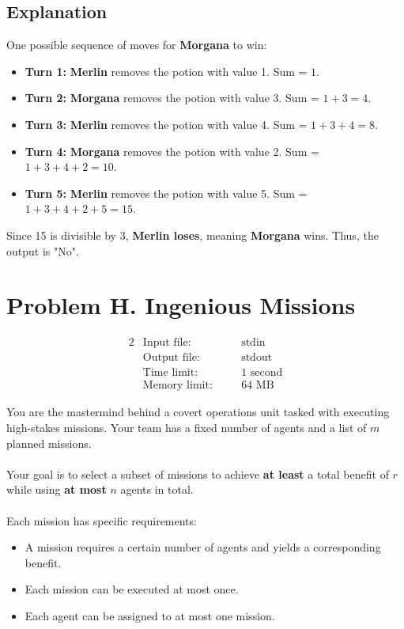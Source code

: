 \documentclass[12pt,a4paper]{article}
\begin{document}
\subsection*{\fontsize{16}{12}Explanation}
One possible sequence of moves for \textbf{Morgana} to win:
\begin{itemize}
    \item \textbf{Turn 1:} \textbf{Merlin} removes the potion with value 1. Sum = \( 1 \).
    \item \textbf{Turn 2:} \textbf{Morgana} removes the potion with value 3. Sum = \( 1 + 3 = 4 \).
    \item \textbf{Turn 3:} \textbf{Merlin} removes the potion with value 4. Sum = \( 1 + 3 + 4 = 8 \).
    \item \textbf{Turn 4:} \textbf{Morgana} removes the potion with value 2. Sum = \( 1 + 3 + 4 + 2 = 10 \).
    \item \textbf{Turn 5:} \textbf{Merlin} removes the potion with value 5. Sum = \( 1 + 3 + 4 + 2 + 5 = 15 \).
\end{itemize}
Since 15 is divisible by 3, \textbf{Merlin loses}, meaning \textbf{Morgana} wins. Thus, the output is "No".

\newpage

\section*{\fontsize{18}{12}Problem H. Ingenious Missions}

\begin{alignat*} {2}
 &   \text{Input file:}   \quad     &&\text{stdin}\\
 &   \text{Output file:}  \quad     &&\text{stdout}\\
 &   \text{Time limit:}   \quad     &&\text{1 second}\\
 &   \text{Memory limit:} \quad     &&\text{64 MB}
\end{alignat*}

\noindent
You are the mastermind behind a covert operations unit tasked with executing high-stakes missions. Your team has a fixed number of agents and a list of \( m \) planned missions. 
\\\\
\noindent
Your goal is to select a subset of missions to achieve \textbf{at least} a total benefit of \( r \) while using \textbf{at most} \( n \) agents in total.
\\\\
\noindent
Each mission has specific requirements:
\begin{itemize}
  \item A mission requires a certain number of agents and yields a corresponding benefit.
  \item Each mission can be executed at most once.
  \item Each agent can be assigned to at most one mission.
\end{itemize}
\end{document}
